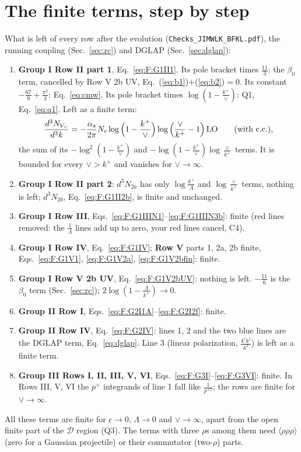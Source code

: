 \documentclass[10pt]{article}
\numberwithin{equation}{section}
\begin{document}
\section{The finite terms, step by step}\label{sec:fin}
What is left of every row after the evolution (\texttt{Checks\_JIMWLK\_BFKL.pdf}), the running coupling (Sec.~\ref{sec:rc}) and DGLAP (Sec.~\ref{sec:dglap}):
\begin{enumerate}
\item \textbf{Group I Row II part 1}, Eq.~\eqref{eq:F:G1II1}. Its pole bracket times $\frac{11}{3}$: the $\beta_0$ term, cancelled by Row V 2b UV, Eq.~(\ref{eq:b1})$+$(\ref{eq:b2})$=0$. Its constant $-\frac{67}{9}+\frac{\pi^2}{3}$: Eq.~\eqref{eq:cmw}. Its pole bracket times $\log(1-\frac{k^+}{\vee})$: Q1, Eq.~\eqref{eq:q1}. Left as a finite term:
\begin{equation}
\frac{d^3N_{V_\vee}}{d^3k}=-\frac{\alpha_s}{2\pi}N_c\log\Big(1-\frac{k^+}{\vee}\Big)\log\Big(\frac{\vee}{k^+}-1\Big)\,{\rm LO}\qquad(\text{with c.c.}),
\label{eq:Vvee}
\end{equation}
the sum of its $-\log^2(1-\frac{k^+}{\vee})$ and $-\log(1-\frac{k^+}{\vee})\log\frac{\vee}{k^+}$ terms. It is bounded for every $\vee>k^+$ and vanishes for $\vee\to\infty$.
\item \textbf{Group I Row II part 2}: $d^3N_{2a}$ has only $\log\frac{k^+}{\Lambda}$ and $\log\frac{\vee}{k^+}$ terms, nothing is left; $d^3N_{2b}$, Eq.~\eqref{eq:F:G1II2b}, is finite and unchanged.
\item \textbf{Group I Row III}, Eqs.~\eqref{eq:F:G1IIIN1}--\eqref{eq:F:G1IIIN3b}: finite (red lines removed: the $\frac{1}{\Lambda}$ lines add up to zero, your red lines cancel, C4).
\item \textbf{Group I Row IV}, Eq.~\eqref{eq:F:G1IV}; \textbf{Row V} parts 1, 2a, 2b finite, Eqs.~\eqref{eq:F:G1V1}, \eqref{eq:F:G1V2a}, \eqref{eq:F:G1V2bfin}: finite.
\item \textbf{Group I Row V 2b UV}, Eq.~\eqref{eq:F:G1V2bUV}: nothing is left. $-\frac{11}{6}$ is the $\beta_0$ term (Sec.~\ref{sec:rc}); $2\log(1-\frac{\Lambda}{k^+})\to0$.
\item \textbf{Group II Row I}, Eqs.~\eqref{eq:F:G2I1A}--\eqref{eq:F:G2I2f}: finite.
\item \textbf{Group II Row IV}, Eq.~\eqref{eq:F:G2IV}: lines 1, 2 and the two blue lines are the DGLAP term, Eq.~\eqref{eq:dglap}. Line 3 (linear polarization, $\frac{k^ik^j}{k^2}$) is left as a finite term.
\item \textbf{Group III Rows I, II, III, V, VI}, Eqs.~\eqref{eq:F:G3I}--\eqref{eq:F:G3VI}: finite. In Rows III, V, VI the $p^+$ integrands of line 1 fall like $\frac{1}{p^{+2}}$; the rows are finite for $\vee\to\infty$.
\end{enumerate}
All these terms are finite for $\epsilon\to0$, $\Lambda\to0$ and $\vee\to\infty$, apart from the open finite part of the $\mathcal D$ region (Q3). The terms with three $\rho$\textquotesingle s among them need $\langle\rho\rho\rho\rangle$ (zero for a Gaussian projectile) or their commutator (two-$\rho$) parts.
\end{document}
